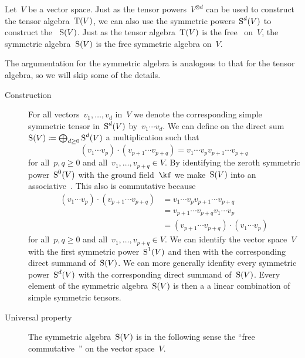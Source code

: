 \begin{recall}
  Let~$V$ be a vector space.
  Just as the tensor powers~$V^{\otimes d}$ can be used to construct the tensor algebra~$\operatorname{T}(V)$, we can also use the symmetric powers~$\operatorname{S}^d(V)$ to construct the ~$\operatorname{S}(V)$.
  Just as the tensor algebra~$\operatorname{T}(V)$ is the free~\algebra{$\kf$} on~$V$, the symmetric algebra~$\operatorname{S}(V)$ is the free symmetric algebra on~$V$.

  The argumentation for the symmetric algebra is analogous to that for the tensor algebra, so we will skip some of the details.
  
  \begin{description}
    \item[Construction]
      For all vectors~$v_1, \dotsc, v_d$ in~$V$ we denote the corresponding simple symmetric tensor in~$\operatorname{S}^d(V)$ by~$v_1 \dotsm v_d$.
      We can define on the direct sum~$\operatorname{S}(V) \coloneqq \bigoplus_{d \geq 0} \operatorname{S}^d(V)$ a multiplication such that
      \[
        (v_1 \dotsm v_p) \cdot (v_{p+1} \dotsm v_{p+q})
        =
        v_1 \dotsm v_p v_{p+1} \dotsm v_{p+q}
      \]
      for all~$p, q \geq 0$ and all~$v_1, \dotsc, v_{p+q} \in V$.
      By identifying the zeroth symmetric power~$\operatorname{S}^0(V)$ with the ground field~$\kf$ we make~$\operatorname{S}(V)$ into an associative~{\algebra{$\kf$}}.
      This also is commutative because
      \begin{align*}
        (v_1 \dotsm v_p) \cdot (v_{p+1} \dotsm v_{p+q})
        &=
        v_1 \dotsm v_p v_{p+1} \dotsm v_{p+q}
        \\
        &=
        v_{p+1} \dotsm v_{p+q} v_1 \dotsm v_p
        \\
        &=
        (v_{p+1} \dotsm v_{p+q}) \cdot (v_1 \dotsm v_p)
      \end{align*}
      for all~$p, q \geq 0$ and all~$v_1, \dotsc, v_{p+q} \in V$. 
      We can identify the vector space~$V$ with the first symmetric power~$\operatorname{S}^1(V)$ and then with the corresponding direct summand of~$\operatorname{S}(V)$.
      We can more generally idenfity every symmetric power~$\operatorname{S}^d(V)$ with the corresponding direct summand of~$\operatorname{S}(V)$.
      Every element of the symmetric algebra~$\operatorname{S}(V)$ is then a a linear combination of simple symmetric tensors.
      
    \item[Universal property]
      The symmetric algebra~$\operatorname{S}(V)$ is in the following sense the \enquote{free commutative~{\algebra{$\kf$}}} on the vector space~$V$.


\end{description}
\end{recall}
